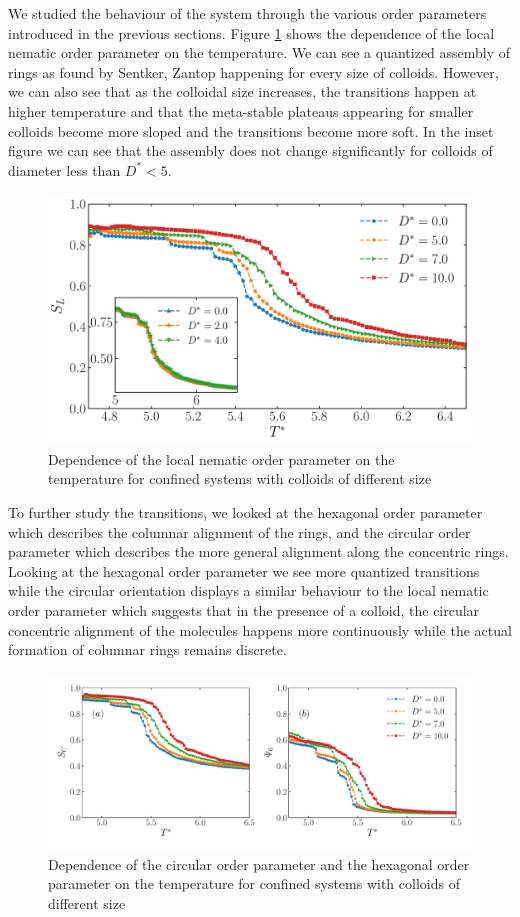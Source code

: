 We studied the behaviour of the system through the various order parameters introduced in the previous sections. 
Figure \ref{fig:ceoC8nemloc} shows the dependence of the local nematic order parameter on the temperature. We can see a quantized assembly of rings as found by Sentker, Zantop \cite{sentker2018quantized} happening for every size of colloids. However, we can also see that as the colloidal size increases, the transitions happen at higher temperature and that the meta-stable plateaus appearing for smaller colloids become more sloped and the transitions become more soft. In the inset figure we can see that the assembly does not change significantly for colloids of diameter less than $D^* < 5$.


\begin{figure}[H]
    \centering
	\includegraphics[width=0.8\linewidth]{plots/ceo_W8C8_nemloc.pdf}
	\caption{Dependence of the local nematic order parameter on the temperature for confined systems with colloids of different size}
    \label{fig:ceoC8nemloc}
\end{figure}
To further study the transitions, we looked at the hexagonal order parameter which describes the columnar alignment of the rings, and the circular order parameter which describes the more general alignment along the concentric rings. 
Looking at the hexagonal order parameter we see more quantized transitions while the circular orientation
displays a similar behaviour to the local nematic order parameter which suggests that in the presence of a colloid, the circular concentric alignment of the molecules happens more continuously while the actual formation of columnar rings remains discrete.  

\begin{figure}[H]
    \centering
	\includegraphics[width=\linewidth]{plots/ceo_W8C8_circhex.pdf}
	\caption{Dependence of the circular order parameter and the hexagonal order parameter  on the temperature for confined systems with colloids of different size}
    \label{fig:ceoC8hex}
\end{figure}

